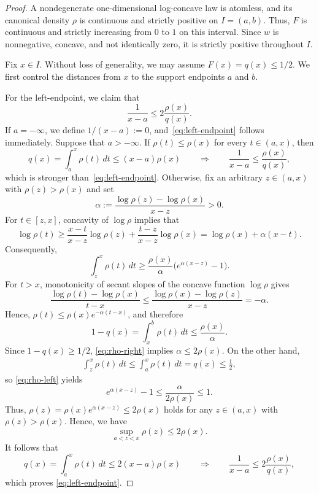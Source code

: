 \documentclass[11pt]{article}
\theoremstyle{definition}
\theoremstyle{remark}
\begin{document}
\begin{proof}
A nondegenerate one-dimensional log-concave law is atomless, and its canonical density
$\rho$ is continuous and strictly positive on $I=(a,b)$.  Thus, $F$ is continuous and strictly increasing from $0$ to $1$ on this interval. Since $w$ is nonnegative, concave, and not identically zero, it is strictly positive throughout $I$. 

Fix $x\in I$. Without loss of generality, we may assume $F(x)=q(x)\le1/2$. We first control the distances from $x$ to the support endpoints $a$ and $b$.  

For the left-endpoint, we claim that
\begin{equation}\label{eq:left-endpoint}
 \frac1{x-a}\le2\frac{\rho(x)}{q(x)}.
\end{equation}
If $a=-\infty$, we define $1/(x-a):=0$, and~\eqref{eq:left-endpoint} follows immediately.  Suppose that $a> -\infty$.  
If $\rho(t)\le\rho(x)$ for every $t\in (a,x)$, then
\[
 q(x)=\int_a^x\rho(t)\,dt\le(x-a)\rho(x)\qquad \Longrightarrow \qquad \frac{1}{x-a}\leq \frac{\rho(x)}{q(x)},
\]
which is stronger than~\eqref{eq:left-endpoint}.  Otherwise, fix an arbitrary $z\in (a,x)$ with
$\rho(z)>\rho(x)$ and set
\[
 \alpha:=\frac{\log\rho(z)-\log\rho(x)}{x-z}>0.
\]
For $t\in[z,x]$, concavity of $\log\rho$ implies that
\[
 \log\rho(t)
 \ge
 \frac{x-t}{x-z}\log\rho(z)
 +\frac{t-z}{x-z}\log\rho(x)
 =\log\rho(x)+\alpha(x-t).
\]
Consequently,
\begin{equation}\label{eq:rho-left}
 \int_z^x\rho(t)\,dt
 \ge
 \frac{\rho(x)}\alpha\bigl(e^{\alpha(x-z)}-1\bigr).
\end{equation}
For $t>x$, monotonicity of secant slopes of the concave function
$\log\rho$ gives
\[
 \frac{\log\rho(t)-\log\rho(x)}{t-x}
 \le
 \frac{\log\rho(x)-\log\rho(z)}{x-z}
 =-\alpha.
\]
Hence, $\rho(t)\le\rho(x)e^{-\alpha(t-x)}$, and therefore
\begin{equation}\label{eq:rho-right}
 1-q(x)=\int_x^b\rho(t)\,dt
 \le
 \frac{\rho(x)}\alpha.
\end{equation}
Since $1-q(x)\ge1/2$, \eqref{eq:rho-right} implies
$\alpha\le2\rho(x)$.  On the other hand,
\begin{align*}
    \int_z^x\rho(t)\,dt\leq \int_a^x\rho(t)\,dt=q(x)\leq \frac{1}{2},
\end{align*}
so \eqref{eq:rho-left} yields
\[
 e^{\alpha(x-z)}-1
 \le
 \frac{\alpha}{2\rho(x)}
 \le1.
\]
Thus, $\rho(z)=\rho(x)e^{\alpha(x-z)}\le2\rho(x)$ holds for any $z\in (a,x)$ with $\rho(z)>\rho(x)$. Hence, we have
\[
 \sup_{a<z<x}\rho(z)\le2\rho(x).
\]
It follows that
\[
 q(x)=\int_a^x\rho(t)\,dt\le2(x-a)\rho(x)\qquad \Longrightarrow \qquad \frac{1}{x-a}\leq 2\frac{\rho(x)}{q(x)},
\]
which proves \eqref{eq:left-endpoint}.


\end{proof}
\end{document}

